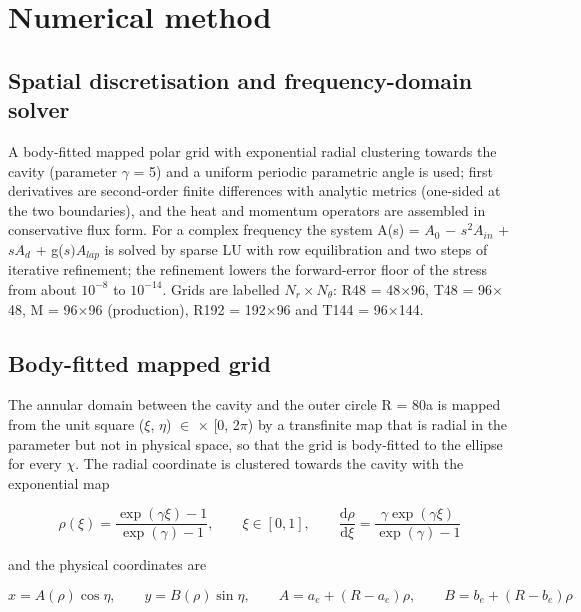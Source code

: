 \documentclass[preprint,12pt]{elsarticle}
\begin{document}
\section{Numerical method}
\label{sec:4}

\subsection{Spatial discretisation and frequency-domain solver}
\label{sec:4.1}

A body-fitted mapped polar grid with exponential radial clustering towards the cavity (parameter $\gamma$ = 5) and a uniform periodic parametric angle is used; first derivatives are second-order finite differences with analytic metrics (one-sided at the two boundaries), and the heat and momentum operators are assembled in conservative flux form. For a complex frequency the system A(s) = $A_{0}$ $-$ $s^{2}A_{in}$ + $sA_{d}$ + g($s)A_{lap}$ is solved by sparse LU with row equilibration and two steps of iterative refinement; the refinement lowers the forward-error floor of the stress from about $10^{-8}$ to $10^{-14}$. Grids are labelled $N_{r}\times N_{\theta}$: R48 = 48$\times$96, T48 = 96$\times$48, M = 96$\times$96 (production), R192 = 192$\times$96 and T144 = 96$\times$144.

\subsection{Body-fitted mapped grid}
\label{sec:4.2}

The annular domain between the cavity and the outer circle R = 80a is mapped from the unit square ($\xi$, $\eta$) $\in$ \cite{florence1959} $\times$ [0, 2$\pi$) by a transfinite map that is radial in the parameter but not in physical space, so that the grid is body-fitted to the ellipse for every $\chi$. The radial coordinate is clustered towards the cavity with the exponential map

\begin{equation}
\rho(\xi)=\frac{\exp(\gamma\xi)-1}{\exp(\gamma)-1},\qquad \xi\in[0,1],\qquad \frac{\mathrm{d}\rho}{\mathrm{d}\xi}=\frac{\gamma\exp(\gamma\xi)}{\exp(\gamma)-1} 
\label{eq:51}
\end{equation}

and the physical coordinates are

\begin{equation}
x=A(\rho)\cos\eta,\qquad y=B(\rho)\sin\eta,\qquad A=a_e+(R-a_e)\rho,\qquad B=b_e+(R-b_e)\rho 
\label{eq:52}
\end{equation}
\end{document}
